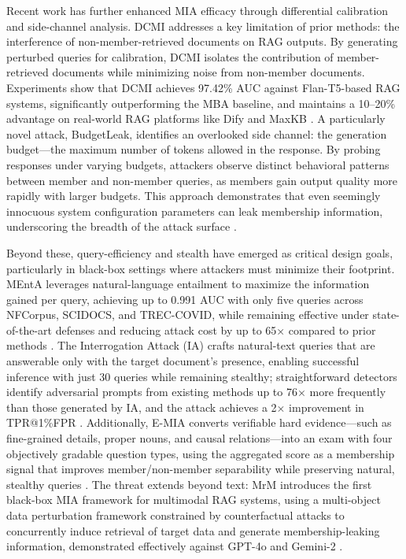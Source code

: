 \documentclass[11pt]{article}
\begin{document}
Recent work has further enhanced MIA efficacy through differential calibration and side-channel analysis. DCMI addresses a key limitation of prior methods: the interference of non-member-retrieved documents on RAG outputs. By generating perturbed queries for calibration, DCMI isolates the contribution of member-retrieved documents while minimizing noise from non-member documents. Experiments show that DCMI achieves 97.42\% AUC against Flan-T5-based RAG systems, significantly outperforming the MBA baseline, and maintains a 10--20\% advantage on real-world RAG platforms like Dify and MaxKB \cite{ref475}. A particularly novel attack, BudgetLeak, identifies an overlooked side channel: the generation budget---the maximum number of tokens allowed in the response. By probing responses under varying budgets, attackers observe distinct behavioral patterns between member and non-member queries, as members gain output quality more rapidly with larger budgets. This approach demonstrates that even seemingly innocuous system configuration parameters can leak membership information, underscoring the breadth of the attack surface \cite{ref476}.

Beyond these, query-efficiency and stealth have emerged as critical design goals, particularly in black-box settings where attackers must minimize their footprint. MEntA leverages natural-language entailment to maximize the information gained per query, achieving up to 0.991 AUC with only five queries across NFCorpus, SCIDOCS, and TREC-COVID, while remaining effective under state-of-the-art defenses and reducing attack cost by up to 65× compared to prior methods \cite{ref477}. The Interrogation Attack (IA) crafts natural-text queries that are answerable only with the target document's presence, enabling successful inference with just 30 queries while remaining stealthy; straightforward detectors identify adversarial prompts from existing methods up to 76× more frequently than those generated by IA, and the attack achieves a 2× improvement in TPR@1\%FPR \cite{ref478}. Additionally, E-MIA converts verifiable hard evidence---such as fine-grained details, proper nouns, and causal relations---into an exam with four objectively gradable question types, using the aggregated score as a membership signal that improves member/non-member separability while preserving natural, stealthy queries \cite{ref479}. The threat extends beyond text: MrM introduces the first black-box MIA framework for multimodal RAG systems, using a multi-object data perturbation framework constrained by counterfactual attacks to concurrently induce retrieval of target data and generate membership-leaking information, demonstrated effectively against GPT-4o and Gemini-2 \cite{ref480}.
\end{document}
